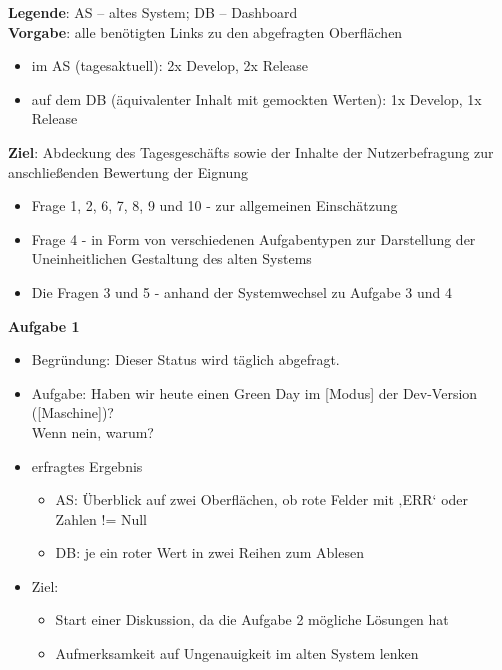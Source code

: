 \textbf{Legende}: AS – altes System; DB – Dashboard\\
\textbf{Vorgabe}: alle benötigten Links zu den abgefragten Oberflächen
\begin{itemize}
    \item im AS (tagesaktuell): 2x Develop, 2x Release
    \item auf dem DB (äquivalenter Inhalt mit gemockten Werten): 1x Develop, 1x Release
\end{itemize}
\textbf{Ziel}: Abdeckung des Tagesgeschäfts sowie der Inhalte der Nutzerbefragung zur anschließenden Bewertung der Eignung
\begin{itemize}
    \item Frage 1, 2, 6, 7, 8, 9 und 10 - zur allgemeinen Einschätzung
    \item Frage 4 - in Form von verschiedenen Aufgabentypen zur Darstellung der Uneinheitlichen Gestaltung des alten Systems
    \item Die Fragen 3 und 5 - anhand der Systemwechsel zu Aufgabe 3 und 4
\end{itemize}

\newpage
\noindent
\textbf{Aufgabe 1}
\begin{itemize}
    \item Begründung: Dieser Status wird täglich abgefragt.
    \item Aufgabe: Haben wir heute einen Green Day im [Modus] der Dev-Version ([Maschine])?\\
            Wenn nein, warum?
    \item erfragtes Ergebnis
    \begin{itemize}
        \item AS: Überblick auf zwei Oberflächen, ob rote Felder mit ‚ERR‘ oder Zahlen != Null
        \item DB: je ein roter Wert in zwei Reihen zum Ablesen
    \end{itemize}
    \item Ziel:
    \begin{itemize}
        \item Start einer Diskussion, da die Aufgabe 2 mögliche Lösungen hat
        \item Aufmerksamkeit auf Ungenauigkeit im alten System lenken
    \end{itemize}
\end{itemize}

